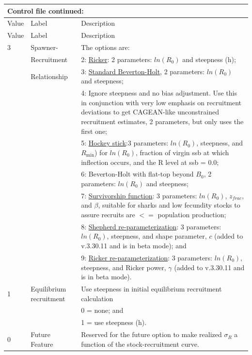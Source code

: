 \begin{longtable}{p{1cm} p{3cm} p{11cm}}
	\multicolumn{3}{l}{Control file continued:} \\
	\hline
	Value & Label & Description \Tstrut\Bstrut\\
	\hline
	\endfirsthead

	\hline
	Value & Label & Description \Tstrut\Bstrut\\
	\hline
	\endhead
	\hline
	\endfoot
	\endlastfoot

	3 & Spawner-            & The options are: \Tstrut\\
	  & Recruitment         & 2: \hyperlink{Ricker}{Ricker}: 2 parameters: $ln(R_{0})$ and steepness (h); \\
	  & Relationship        & 3: \hyperlink{BH}{Standard Beverton-Holt}, 2 parameters: $ln(R_{0})$ and steepness; \\
	  &                     & 4: Ignore steepness and no bias adjustment. Use this in conjunction with very low emphasis on recruitment deviations to get CAGEAN-like unconstrained recruitment estimates, 2 parameters, but only uses the first one; \\
	  &                     & 5: \hyperlink{Hockey}{Hockey stick}:3 parameters: $ln(R_{0})$, steepness, and $R_{\text{min}}$) for $ln(R_{0})$, fraction of virgin \gls{ssb} at which inflection occurs, and the R level at \gls{ssb} = 0.0; \\
	  &                     & 6: Beverton-Holt with flat-top beyond $B_{0}$, 2 parameters: $ln(R_{0})$ and steepness; \\
	  &                     & 7: \hyperlink{Survivorship}{Survivorship function}: 3 parameters: $ln(R_{0})$, $z_{frac}$, and $\beta$, suitable for sharks and low fecundity stocks to assure recruits are $<=$ population production; \\
	  & 					& 8: \hyperlink{Shepherd}{Shepherd re-parameterization}: 3 parameters: $ln(R_{0})$, steepness, and shape parameter, $c$ (added to v.3.30.11 and is in beta mode); and \\
	  & 					& 9: \hyperlink{Ricker2}{Ricker re-parameterization}: 3 parameters: $ln(R_{0})$, steepness, and Ricker power, $\gamma$ (added to v.3.30.11 and is in beta mode). \Bstrut\\
	\hline

	1 \Tstrut & Equilibrium recruitment & Use steepness in initial equilibrium recruitment calculation \\
	  & 						& 0 = none; and \\
	  &							& 1 = use steepness (h). \\
	0 & Future Feature			& Reserved for the future option to make realized $\sigma_R$ a function of the stock-recruitment curve. \Bstrut\\ 
	\hline
\end{longtable}

